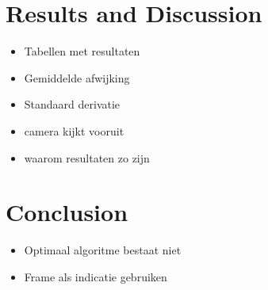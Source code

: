 \documentclass[a4paper]{article}
\begin{document}
\newpage 
\section{Results and Discussion}
\begin{itemize}
\item Tabellen met resultaten
\item Gemiddelde afwijking
\item Standaard derivatie
\end{itemize}
\begin{itemize}
\item camera kijkt vooruit
\item waarom resultaten zo zijn
\end{itemize}

\newpage
\section{Conclusion}
\begin{itemize}
\item Optimaal algoritme bestaat niet
\item Frame als indicatie gebruiken
\end{itemize}
\end{document}

